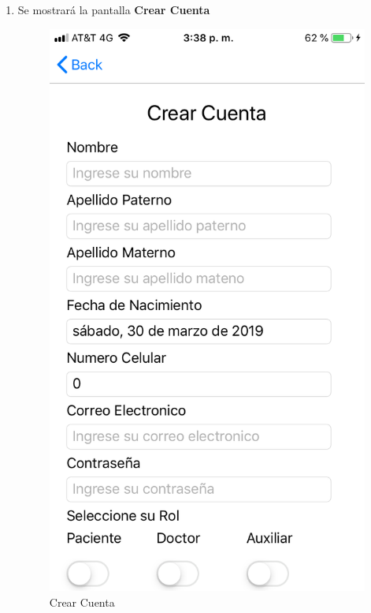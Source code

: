 \begin{enumerate}
	\item Se mostrará la pantalla \textbf{Crear Cuenta}
	\newpage
		\begin{figure}[!htbp]			\hypertarget{fig:crearCuenta}{\hspace{1pt}}
		\begin{center}
			\includegraphics[height=0.4\textheight]{Paciente/RegistrodeCuenta/images/IMG-3181}
			\caption{Crear Cuenta}
			\label{fig:crearCuenta}
		\end{center}
	\end{figure}


\end{enumerate}
